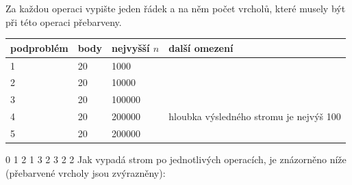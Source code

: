 
Za každou operaci vypište jeden řádek a na něm počet vrcholů,
které musely být při této operaci přebarveny.


\centering
\begin{tabular}{|l|l|l|l|}
\hline
podproblém & body & nejvyšší $n$ & další omezení                  \\ \hline
1       & 20     & 1000      &                                        \\ \hline
2       & 20     & 10000     &                                        \\ \hline
3       & 20     & 100000     &                                        \\ \hline
4       & 20     & 200000    & hloubka výsledného stromu je nejvýš 100 \\ \hline
5       & 20     & 200000    &                                        \\ \hline
\end{tabular}



0
1
2
1
3
2
3
2
2
\sampleCOMMENT
Jak vypadá strom po jednotlivých operacích, je znázorněno níže
(přebarvené vrcholy jsou zvýrazněny):
\sampleEND
{}

